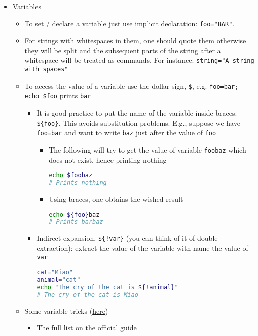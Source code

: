 \documentclass[a4paper,12pt,%
              final%
              ]{article}
\begin{document}
\begin{itemize}
\begin{itemize}
\begin{itemize}
        \end{itemize}
    \end{itemize}
  \item Variables
    \begin{itemize}
      \item To set / declare a variable just use implicit declaration: \verb|foo="BAR"|.
      \item For strings with whitespaces in them, one should quote them otherwise they will be split and the subsequent parts of the string after a whitespace will be treated as commands. For instance: \verb|string="A string with spaces"|
      \item To access the value of a variable use the dollar sign, \verb|$|, e.g. \verb|foo=bar; echo $foo| prints \texttt{bar}
        \begin{itemize}
          \item It is good practice to put the name of the variable inside braces: \verb|${foo}|. This avoids substitution problems. E.g., suppose we have \verb|foo=bar| and want to write \texttt{baz} just after the value of \texttt{foo}
            \begin{itemize}
              \item The following will try to get the value of variable \texttt{foobaz} which does not exist, hence printing nothing
\begin{lstlisting}[language=bash]
echo $foobaz
# Prints nothing
\end{lstlisting}
              \item Using braces, one obtains the wished result
\begin{lstlisting}[language=bash]
echo ${foo}baz
# Prints barbaz
\end{lstlisting}
            \end{itemize}
          \item Indirect expansion, \verb|${!var}| (you can think of it of double extraction): extract the value of the variable with name the value of \verb|var|
\begin{lstlisting}[language=bash]
cat="Miao"
animal="cat"
echo "The cry of the cat is ${!animal}"
# The cry of the cat is Miao
\end{lstlisting}
        \end{itemize}
      \item Some variable tricks (\href{https://tldp.org/LDP/abs/html/parameter-substitution.html}{here})
        \begin{itemize}
          \item The full list on the \href{https://www.gnu.org/software/bash/manual/html_node/Shell-Parameter-Expansion.html}{official guide}

\end{itemize}
\end{itemize}
\end{itemize}
\end{document}

